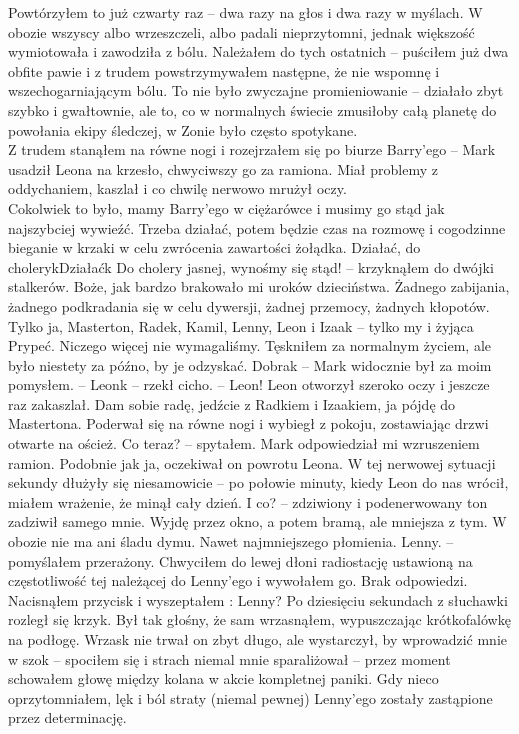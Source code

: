 \documentclass[../MAIN.tex]{subfiles}
\begin{document}
Powtórzyłem to już czwarty raz -- dwa razy na głos i dwa razy w myślach. W obozie wszyscy albo wrzeszczeli, albo padali nieprzytomni, jednak większość wymiotowała i zawodziła z bólu. Należałem do tych ostatnich -- puściłem już dwa obfite pawie i z trudem powstrzymywałem następne, że nie wspomnę i wszechogarniającym bólu. To nie było zwyczajne promieniowanie -- działało zbyt szybko i gwałtownie, ale to, co w normalnych świecie zmusiłoby całą planetę do powołania ekipy śledczej, w Zonie było często spotykane.\\
Z trudem stanąłem na równe nogi i rozejrzałem się po biurze Barry’ego -- Mark usadził Leona na krzesło, chwyciwszy go za ramiona. Miał problemy z oddychaniem, kaszlał i co chwilę nerwowo mrużył oczy.\\
Cokolwiek to było, mamy Barry’ego w ciężarówce i musimy go stąd jak najszybciej wywieźć. Trzeba działać, potem będzie czas na rozmowę i cogodzinne bieganie w krzaki w celu zwrócenia zawartości żołądka. Działać, do cholery\3kDziałać\3k
% 
\sx Do cholery jasnej, wynośmy się stąd! -- krzyknąłem do dwójki stalkerów.
\qd
Boże, jak bardzo brakowało mi uroków dzieciństwa. Żadnego zabijania, żadnego podkradania się w celu dywersji, żadnej przemocy, żadnych kłopotów. Tylko ja, Masterton, Radek, Kamil, Lenny, Leon i Izaak -- tylko my i żyjąca Prypeć. Niczego więcej nie wymagaliśmy. Tęskniłem za normalnym życiem, ale było niestety za późno, by je odzyskać.
% 
\sx Dobra\3k -- Mark widocznie był za moim pomysłem. -- Leon\3k -- rzekł cicho. -- Leon!
\qd
Leon otworzył szeroko oczy i jeszcze raz zakaszlał.
% 
\sx Dam sobie radę, jedźcie z Radkiem i Izaakiem, ja pójdę do Mastertona.
\qd
Poderwał się na równe nogi i wybiegł z pokoju, zostawiając drzwi otwarte na oścież.
\sx Co teraz? -- spytałem.
\qd
Mark odpowiedział mi wzruszeniem ramion. Podobnie jak ja, oczekiwał on powrotu Leona. W tej nerwowej sytuacji sekundy dłużyły się niesamowicie -- po połowie minuty, kiedy Leon do nas wrócił, miałem wrażenie, że minął cały dzień.
\sx I co? -- zdziwiony i podenerwowany ton zadziwił samego mnie.
\qd
Wyjdę przez okno, a potem bramą, ale mniejsza z tym. W obozie nie ma ani śladu dymu. Nawet najmniejszego płomienia.
Lenny. -- pomyślałem przerażony.
Chwyciłem do lewej dłoni radiostację ustawioną na częstotliwość tej należącej do Lenny’ego i wywołałem go. Brak odpowiedzi. Nacisnąłem przycisk i wyszeptałem :
\sx Lenny?\qd
Po dziesięciu sekundach z słuchawki rozległ się krzyk. Był tak głośny, że sam wrzasnąłem, wypuszczając krótkofalówkę na podłogę. Wrzask nie trwał on zbyt długo, ale wystarczył, by wprowadzić mnie w szok -- spociłem się i strach niemal mnie sparaliżował -- przez moment schowałem głowę między kolana w akcie kompletnej paniki. Gdy nieco oprzytomniałem, lęk i ból straty (niemal pewnej) Lenny’ego zostały zastąpione przez determinację.
\end{document}
